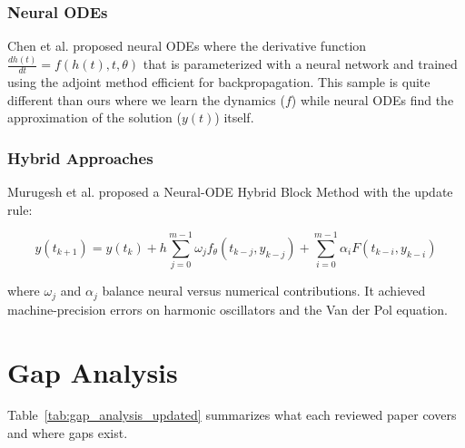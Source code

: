 \subsubsection{Neural ODEs}

Chen et al. \cite{chen2018neural} proposed neural ODEs where the derivative function $\frac{dh(t)}{dt} = f(h(t), t, \theta)$ that is parameterized with a neural network and trained using the adjoint method efficient for backpropagation. This sample is quite different than ours where we learn the dynamics ($f$) while neural ODEs find the approximation of the solution ($y(t)$) itself.

\subsubsection{Hybrid Approaches}

Murugesh et al. \cite{murugesh2025novel} proposed a Neural-ODE Hybrid Block Method with the update rule:

\begin{equation}
y(t_{k+1}) = y(t_k) + h \sum_{j=0}^{m-1} \omega_j f_\theta(t_{k-j}, y_{k-j}) + \sum_{i=0}^{m-1} \alpha_i F(t_{k-i}, y_{k-i})
\end{equation}

where $\omega_j$ and $\alpha_j$ balance neural versus numerical contributions. It achieved machine-precision errors on harmonic oscillators and the Van der Pol equation.

\clearpage %

\section{Gap Analysis}

Table~\ref{tab:gap_analysis_updated} summarizes what each reviewed paper covers and where gaps exist.

\vspace{-1em} %


